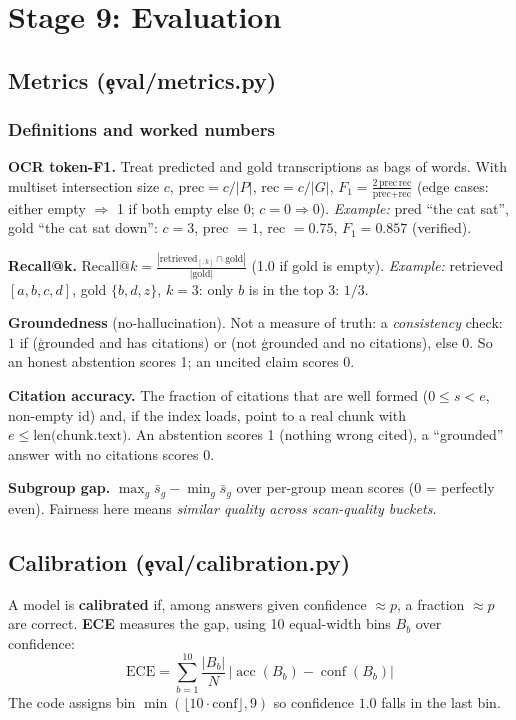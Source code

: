 \chapter{Stage 9: Evaluation}\label{ch:eval}
\section{Metrics (\c{eval/metrics.py})}
\subsection{Definitions and worked numbers}
\textbf{OCR token-F1.} Treat predicted and gold transcriptions as bags of words. With multiset intersection size $c$, $\text{prec}=c/|P|$, $\text{rec}=c/|G|$, $F_1=\frac{2\,\text{prec}\,\text{rec}}{\text{prec}+\text{rec}}$ (edge cases: either empty $\Rightarrow$ 1 if both empty else 0; $c=0\Rightarrow0$).
\emph{Example:} pred ``the cat sat'', gold ``the cat sat down'': $c=3$, prec $=1$, rec $=0.75$, $F_1=0.857$ (verified).

\textbf{Recall@k.} $\displaystyle \text{Recall@}k=\frac{|\text{retrieved}_{[:k]}\cap\text{gold}|}{|\text{gold}|}$ (1.0 if gold is empty).
\emph{Example:} retrieved $[a,b,c,d]$, gold $\{b,d,z\}$, $k=3$: only $b$ is in the top 3: $1/3$.

\textbf{Groundedness} (no-hallucination). Not a measure of truth: a \emph{consistency} check: $1$ if (\c{grounded} and has citations) or (not \c{grounded} and no citations), else $0$. So an honest abstention scores 1; an uncited claim scores 0.

\textbf{Citation accuracy.} The fraction of citations that are well formed ($0\le s<e$, non-empty id) and, if the index loads, point to a real chunk with $e\le\text{len(chunk.text)}$. An abstention scores 1 (nothing wrong cited), a ``grounded'' answer with no citations scores 0.

\textbf{Subgroup gap.} $\max_g\bar s_g-\min_g\bar s_g$ over per-group mean scores (0 = perfectly even). Fairness here means \emph{similar quality across scan-quality buckets}.

\section{Calibration (\c{eval/calibration.py})}
A model is \textbf{calibrated} if, among answers given confidence $\approx p$, a fraction $\approx p$ are correct. \textbf{ECE} measures the gap, using 10 equal-width bins $B_b$ over confidence:
\[ \mathrm{ECE}=\sum_{b=1}^{10}\frac{|B_b|}{N}\,\bigl|\operatorname{acc}(B_b)-\operatorname{conf}(B_b)\bigr| \]
The code assigns bin $\min(\lfloor 10\cdot\text{conf}\rfloor,9)$ so confidence $1.0$ falls in the last bin.

